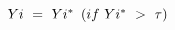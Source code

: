 $Yi{\rm{\ }} = {\rm{\ }}Y{{i}^{\rm{*}}}{\rm{\ }}\left( {if{\rm{\ }}Y{{i}^{\rm{*}}}{\rm{\ }} > {\rm{\ }}\tau } \right)$
